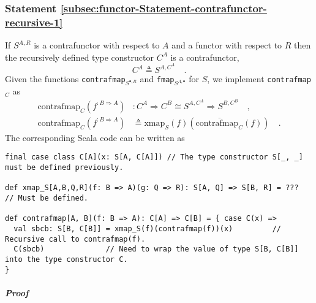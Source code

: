 \subsubsection{Statement \label{subsec:functor-Statement-contrafunctor-recursive-1}\ref{subsec:functor-Statement-contrafunctor-recursive-1}}

If $S^{A,R}$ is a contrafunctor with respect to $A$ and a functor
with respect to $R$ then the recursively defined type constructor
$C^{A}$ is a contrafunctor,
\[
C^{A}\triangleq S^{A,C^{A}}\quad.
\]
Given the functions \lstinline!contrafmap!$_{S^{\bullet,R}}$ and
\lstinline!fmap!$_{S^{A,\bullet}}$ for $S$, we implement \lstinline!contrafmap!$_{C}$
as
\begin{align*}
\text{contrafmap}_{C}(f^{:B\Rightarrow A}) & :C^{A}\Rightarrow C^{B}\cong S^{A,C^{A}}\Rightarrow S^{B,C^{B}}\quad,\\
\text{contrafmap}_{C}(f^{:B\Rightarrow A}) & \triangleq\text{xmap}_{S}(f)(\overline{\text{contrafmap}_{C}}(f))\quad.
\end{align*}
The corresponding Scala code can be written as
\begin{lstlisting}
final case class C[A](x: S[A, C[A]]) // The type constructor S[_, _] must be defined previously.

def xmap_S[A,B,Q,R](f: B => A)(g: Q => R): S[A, Q] => S[B, R] = ???          // Must be defined.

def contrafmap[A, B](f: B => A): C[A] => C[B] = { case C(x) =>
  val sbcb: S[B, C[B]] = xmap_S(f)(contrafmap(f))(x)         // Recursive call to contrafmap(f).
  C(sbcb)              // Need to wrap the value of type S[B, C[B]] into the type constructor C.
}
\end{lstlisting}


\subparagraph{Proof}

